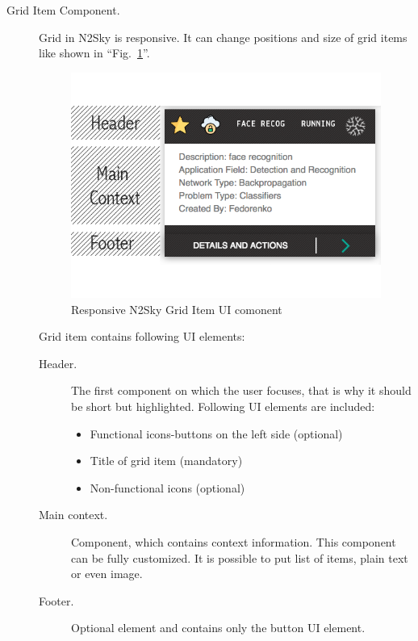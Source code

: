 \begin{description}
\item[Grid Item Component.] Grid in N2Sky is responsive. It can change positions and size of grid items like shown in ``Fig.~\ref{fig:grid_item}''. 

\begin{figure}[htbp]
\begin{center}
  \includegraphics[scale=0.65]{components/3/components/grid_item.png}
  \caption{Responsive N2Sky Grid Item UI comonent}
  \label{fig:grid_item}
\end{center}
\end{figure}


Grid item contains following UI elements: 
\begin{description}
\item[Header. ] The first component on which the user focuses, that is why it should be short but highlighted. Following UI elements are included: 
\begin{itemize}
\item Functional icons-buttons on the left side (optional)
\item Title of grid item (mandatory)
\item  Non-functional icons (optional)
\end{itemize}
\item[Main context. ] Component, which contains context information. This component can be fully customized. It is possible to put list of items, plain text or even image.
 \item[Footer. ] Optional element and contains only the button UI element. 
\end{description}


\end{description}
